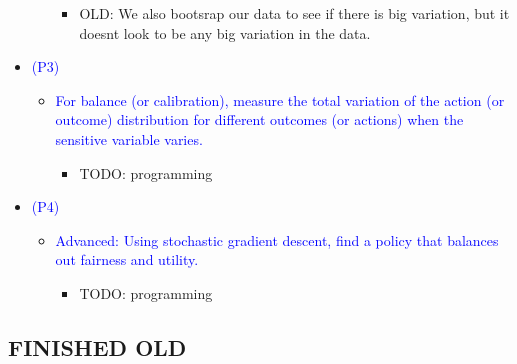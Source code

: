 \begin{itemize}
\begin{itemize}
\begin{itemize}
                \item OLD: We also bootsrap our data to see if there is big variation, but it doesnt look to be any big variation in the data.
            \end{itemize}
        \end{itemize}
    \item \textcolor{blue}{(P3)}
        \begin{itemize}
            \item \textcolor{blue}{For balance (or calibration), measure the total variation of the action (or outcome) distribution for different outcomes (or actions) when the sensitive variable varies.}
            \begin{itemize}
                \item TODO: programming
            \end{itemize}
        \end{itemize}
    \item \textcolor{blue}{(P4)}
        \begin{itemize}
            \item \textcolor{blue}{Advanced: Using stochastic gradient descent, find a policy that balances out fairness and utility.}
            \begin{itemize}
                \item TODO: programming
            \end{itemize}
        \end{itemize}
\end{itemize}
\subsection*{FINISHED OLD}